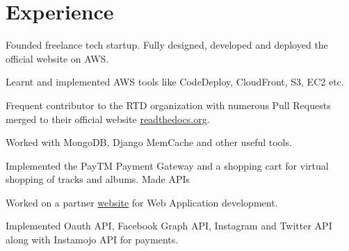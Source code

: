 \documentclass[]{openfont}
\begin{document}
\hfill
\begin{minipage}[t]{0.66\textwidth} 


\section{Experience}

\vspace{\topsep} %
\begin{tightemize}
\item Founded freelance tech startup. Fully designed, developed and deployed the official website on AWS. 
\item Learnt and implemented AWS tools like CodeDeploy, CloudFront, S3, EC2 etc.
\end{tightemize}
\sectionsep

\begin{tightemize}
\item Frequent contributor to the RTD organization with numerous Pull Requests merged to their official website \href{https://readthedocs.org}{readthedocs.org}.
\end{tightemize}
\sectionsep

\begin{tightemize}
\item Worked with MongoDB, Django MemCache and other useful tools.
\item Implemented the PayTM Payment Gateway and a shopping cart for virtual shopping of tracks and albums. Made APIs
\end{tightemize}
\sectionsep

\begin{tightemize}
\item Worked on a partner \href{https://dieticiansforhealth.com}{website} for Web Application development.
\item Implemented Oauth API, Facebook Graph API, Instagram and Twitter API along with Instamojo API for payments.
\end{tightemize}
\sectionsep


\end{minipage}
\end{document}
